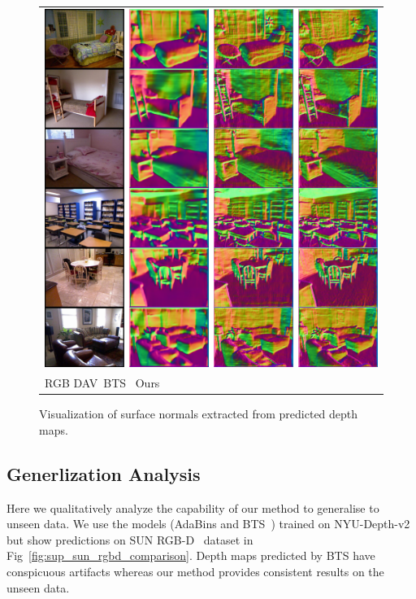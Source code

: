 \documentclass[final]{cvpr}
\begin{document}
\begin{figure}[h]
    \centering
    \begin{tabular}{l}
         \includegraphics[width=\linewidth]{sup-normals.png} \\
         \hspace{0.1\linewidth}RGB \hspace{0.2\linewidth}DAV~\cite{dav_huynh2020guiding}\hspace{0.18\linewidth}BTS~\cite{bts_lee2019big} \hspace{0.19\linewidth}Ours\\
    \end{tabular}
    
    \caption{Visualization of surface normals extracted from predicted depth maps.}
    \label{fig:sup_normals}
\end{figure}



\subsection{Generlization Analysis}
Here we qualitatively analyze the capability of our method to generalise to unseen data. We use the models (AdaBins and BTS~\cite{bts_lee2019big}) trained on NYU-Depth-v2~\cite{Silberman2012} but show predictions on SUN RGB-D~\cite{Song2015_sunrgbd} dataset in Fig~\ref{fig:sup_sun_rgbd_comparison}. Depth maps predicted by BTS have conspicuous artifacts whereas our method provides consistent results on the unseen data.
\end{document}
